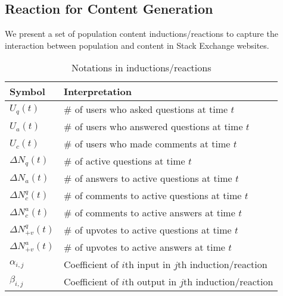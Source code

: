 \subsection{Reaction for Content Generation}
We present a set of population content inductions/reactions to capture the interaction between population and content in Stack Exchange websites. %


\begin{table}[hbt]
	\centering
	\begin{tabular}{|l|l|}
	\hline
	\textbf{Symbol} & \textbf{Interpretation}\\ \hline
	$U_q(t)$ & \# of users who asked questions at time $t$\\
	$U_a(t)$ & \# of users who answered questions at time $t$\\
	$U_c(t)$ & \# of users who made comments at time $t$\\
	$\Delta N_q(t)$ & \# of active questions at time $t$\\
	$\Delta N_a(t)$ & \# of answers to active questions at time $t$\\
	$\Delta N_c^q(t)$ & \# of comments to active questions at time $t$\\
	$\Delta N_c^a(t)$ & \# of comments to active answers at time $t$\\
	$\Delta N_{+v}^q(t)$ & \# of upvotes to active questions at time $t$\\
	$\Delta N_{+v}^a(t)$ & \# of upvotes to active answers at time $t$\\
	$\alpha_{i, j}$ & Coefficient of $i$th input in $j$th induction/reaction\\
	$\beta_{i, j}$ & Coefficient of $i$th output in $j$th induction/reaction\\ \hline
	 \end{tabular}
    \caption{Notations in inductions/reactions}
\end{table}

